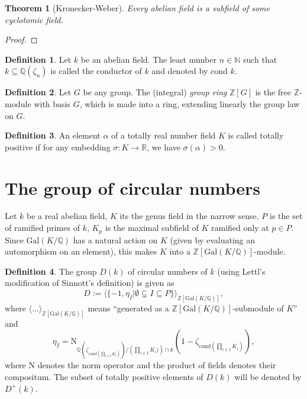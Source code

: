 \documentclass[12pt,a4paper]{article}
\newtheorem{theorem}{Theorem}
\theoremstyle{definition}
\newtheorem{definition}{Definition}[section]
\newcommand{\Qbb}{\mathbb{Q}}
\newcommand{\Q}{\mathbb{Q}}
\newcommand{\R}{\mathbb{R}}
\newcommand{\Z}{\mathbb{Z}}
\newcommand{\Gal}{\mathrm{Gal}}
\newcommand{\cond}{\text{cond }}
\begin{document}
\begin{theorem}[Kronecker-Weber]
Every abelian field is a subfield of some cyclotomic field.
\end{theorem}
\begin{proof}
\end{proof}

\begin{definition}
Let $k$ be an abelian field. The least number $n\in\mathbb{N}$ such that $k\subseteq \Q(\zeta_n)$ is called the conductor of $k$ and denoted by $\cond k$.
\end{definition}

\begin{definition}
Let $G$ be any group. The (integral) \textit{group ring} $\Z[G]$ is the free $\Z$-module with basis $G$, which is made into a ring, extending linearly the group law on $G$.
\end{definition}

\begin{definition}
An element $\alpha$ of a totally real number field $K$ is called totally positive if for any embedding $\sigma: K\to \R$, we have $\sigma(\alpha)>0$.
\end{definition}

\section{The group of circular numbers}
Let $k$ be a real abelian field, $K$ its the genus field in the narrow sense, $P$ is the set of ramified primes of $k$, $K_p$ is the maximal subfield of $K$ ramified only at $p\in P$. Since $\Gal(K/\Q)$ has a natural action on $K$ (given by evaluating an automorphism on an element), this makes $K$ into a $\Z[\Gal(K/\Q)]$-module. 

\begin{definition}
The group $D(k)$ of circular numbers of $k$ (using Lettl's modification of Sinnott's definition) is given as
$$D:=\big\langle \{-1, \eta_I \big\vert \emptyset \subsetneq I \subseteq P \}\big\rangle_{\Z[\Gal(K/\Q)]},$$
where $\langle \dots \rangle_{\Z[\Gal(K/\Q)]}$ means \enquote{generated as a $\Z[\Gal(K/\Q)]$-submodule of $K$} and $$\eta_I=\text{N}_{\Qbb(\zeta_{\text{cond} \left(\prod_{i\in I}K_i\right)})/\left(\prod_{i\in I}K_i)\right)\cap k}\left(1-\zeta_{\text{cond} \left(\prod_{i\in I}K_i\right)}\right),$$ where $\text{N}$ denotes the norm operator and the product of fields denotes their compositum. The subset of totally positive elements of $D(k)$ will be denoted by $D^+(k)$.
\end{definition}
\end{document}
